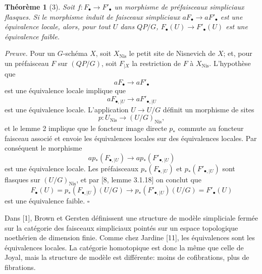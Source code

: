 \documentclass[11pt]{article}
\newcommand{\Nis}{\mathrm{Nis}}
\theoremstyle{deligne}
\newtheorem*{theorem*}{Théorème}
\newenvironment{proofdel}{\noindent\textit{Preuve.}}{\hfill$\square$}
\begin{document}
\begin{theorem*}[3]
Soit \(f:F_\bullet\to F'_\bullet\) un morphisme de préfaisceaux simpliciaux flasques. Si le morphisme induit de faisceaux simpliciaux \(aF_\bullet\to aF'_\bullet\) est une équivalence locale, alors, pour tout \(U\) dans \(QP/G\), \(F_\bullet(U)\to F'_\bullet(U)\) est une équivalence faible.
\end{theorem*}


\begin{proofdel}
Pour un \(G\)-schéma \(X\), soit \(X_{\Nis}\) le petit site de Nisnevich de \(X\); et, pour un préfaisceau \(F\) sur \((QP/G)\), soit \(F_{|X}\) la restriction de \(F\) à \(X_{\Nis}\). L'hypothèse que
\[
  aF_\bullet\longrightarrow aF'_\bullet
\]
est une équivalence locale implique que
\[
  aF_{\bullet,|U}\longrightarrow aF'_{\bullet,|U}
\]
est une équivalence locale. L'application \(U\to U/G\) définit un morphisme de sites
\[
  p:U_{\Nis}\longrightarrow (U/G)_{\Nis},
\]
et le lemme 2 implique que le foncteur image directe \(p_*\) commute au foncteur faisceau associé et envoie les équivalences locales sur des équivalences locales. Par conséquent le morphisme
\[
  a p_*(F_{\bullet,|U})\longrightarrow a p_*(F'_{\bullet,|U})
\]
est une équivalence locale. Les préfaisceaux \(p_*(F_{\bullet,|U})\) et \(p_*(F'_{\bullet,|U})\) sont flasques sur \((U/G)_{\Nis}\), et par [8, lemme 3.1.18] on conclut que
\[
F_\bullet(U)=p_*(F_{\bullet,|U})(U/G)
  \longrightarrow p_*(F'_{\bullet,|U})(U/G)=F'_\bullet(U)
\]
est une équivalence faible.
\end{proofdel}

Dans [1], Brown et Gersten définissent une structure de modèle simpliciale fermée sur la catégorie des faisceaux simpliciaux pointés sur un espace topologique noethérien de dimension finie. Comme chez Jardine [11], les équivalences sont les équivalences locales. La catégorie homotopique est donc la même que celle de Joyal, mais la structure de modèle est différente: moins de cofibrations, plus de fibrations.
\end{document}
